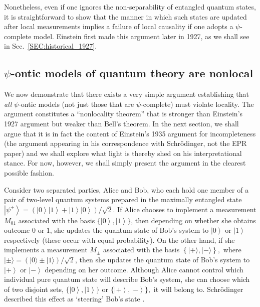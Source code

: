 \documentclass[aps,nofootinbib,12pt]{revtex4}
\begin{document}
Nonetheless, even if one ignores the non-separability of entangled
quantum states, it is straightforward to show that the manner in
which such states are updated after local measurements implies a
failure of local causality if one adopts a $\psi$-complete model.
Einstein first made this argument later in 1927, as we shall see in
Sec.~\ref{SEC:historical_1927}.

\subsection{$\psi$-ontic models of quantum theory are \textbf{nonlocal}
\label{SEC:locality_theorem}}

We now demonstrate that there exists a very simple argument
establishing that \emph{all} $\psi$-ontic models (not just those
that are $\psi$-complete) must violate locality. The argument
constitutes a ``nonlocality theorem'' that is stronger than
Einstein's 1927 argument but weaker than Bell's theorem. In the next
section, we shall argue that it is in fact the content of Einstein's
1935 argument for incompleteness (the argument appearing in his
correspondence with Schr\"{o}dinger, not the EPR paper) and we shall
explore what light is thereby shed on his interpretational stance.
For now, however, we shall simply present the argument in the
clearest possible fashion.

Consider two separated parties, Alice and Bob, who each hold one
member of a pair of two-level quantum systems prepared in the
maximally entangled state $\left\vert \psi^{+}\right\rangle =\left(
\left\vert 0\right\rangle \left\vert 1\right\rangle +\left\vert
1\right\rangle \left\vert 0\right\rangle \right)/\sqrt{2}$. If Alice
chooses to implement a measurement $M_{01}$ associated with the
basis $\{\left\vert 0\right\rangle ,\left\vert 1\right\rangle \}$,
then depending on whether she obtains outcome $0$ or $1$, she
updates the quantum state of Bob's system to $\left\vert
0\right\rangle $ or $\left\vert 1\right\rangle $ respectively (these
occur with equal probability). On the other hand, if she implements
a measurement $M_{\pm}$ associated with the basis $\left\{
|+\rangle,|-\rangle\right\},$ where $|\pm\rangle = (|0\rangle \pm
|1\rangle)/\sqrt{2}$, then she updates the quantum state of Bob's
system to $\left\vert +\right\rangle $ or $\left\vert -\right\rangle
$ depending on her outcome. Although Alice cannot control which
individual pure quantum state will describe Bob's system, she can
choose which of two disjoint sets, $\{\left\vert 0\right\rangle
,\left\vert 1\right\rangle \}$ or $\{\left\vert +\right\rangle
,\left\vert -\right\rangle \},$ it will belong to. Schr\"{o}dinger
described this effect as `steering' Bob's state
\cite{schroed_steer}.
\end{document}

